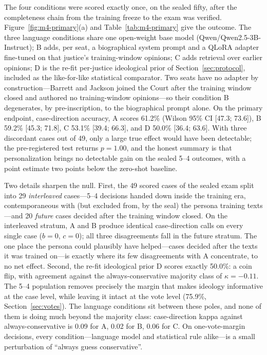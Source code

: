 The four conditions were scored exactly once, on the sealed fifty,
after the completeness chain from the training freeze to the exam was
verified. Figure~\ref{fig:m4-primary}(a) and
Table~\ref{tab:m4-primary} give the outcome. The three language
conditions share one open-weight base model
(Qwen/Qwen2.5-3B-Instruct); B adds, per seat, a biographical system
prompt and a QLoRA adapter fine-tuned on that justice's
training-window opinions; C adds retrieval over earlier opinions; D is
the re-fit per-justice ideological prior of
Section~\ref{sec:protocol}, included as the like-for-like statistical
comparator. Two seats have no adapter by construction---Barrett and
Jackson joined the Court after the training window closed and authored
no training-window opinions---so their condition B degenerates, by
pre-inscription, to the biographical prompt alone. On the primary
endpoint, case-direction accuracy, A scores 61.2\% (Wilson 95\% CI
[47.3; 73.6]), B 59.2\% [45.3; 71.8], C 53.1\% [39.4; 66.3], and D
50.0\% [36.4; 63.6]. With three discordant cases out of 49, only a
large true effect would have been detectable; the pre-registered test
returns $p=1.00$, and the honest summary is that personalization
brings no detectable gain on the sealed 5--4 outcomes, with a point
estimate two points below the zero-shot baseline.

Two details sharpen the null. First, the 49 scored cases of the
sealed exam split into 29
\emph{interleaved} cases---5--4 decisions handed down inside the
training era, contemporaneous with (but excluded from, by the seal)
the persona training texts---and 20 \emph{future} cases decided after
the training window closed. On the interleaved stratum, A and B
produce identical case-direction calls on every single case ($b=0$,
$c=0$); all three disagreements fall in the future stratum. The one
place the persona could plausibly have helped---cases decided after
the texts it was trained on---is exactly where its few disagreements
with A concentrate, to no net effect. Second, the re-fit ideological
prior D scores exactly 50.0\%: a coin flip, with agreement against the
always-conservative majority class of $\kappa=-0.11$. The 5--4
population removes precisely the margin that makes ideology
informative at the case level, while leaving it intact at the vote
level (75.9\%, Section~\ref{sec:votes}). The language conditions sit
between these poles, and none of them is doing much beyond the
majority class: case-direction kappa against always-conservative is
0.09 for A, 0.02 for B, 0.06 for C. On one-vote-margin decisions,
every condition---language model and statistical rule alike---is a
small perturbation of ``always guess conservative''.

